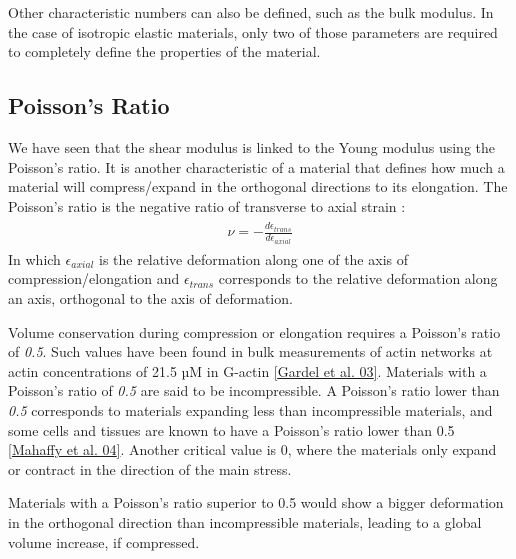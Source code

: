 \documentclass[A4paperpaper,11pt,english]{sphinxmanual}
\begin{document}
Other characteristic numbers can also be defined, such as the bulk modulus. In the case of isotropic
elastic materials, only two of those parameters are required to completely define
the properties of the material.


\subsection{Poisson's Ratio}
\label{index-latex:poisson-s-ratio}
We have seen that the shear modulus is linked to the Young modulus using
the Poisson's ratio. It is another characteristic of a material
that defines how much a material will compress/expand in the orthogonal directions to its elongation.
The Poisson's ratio is the negative ratio of transverse to axial strain :
\label{index-latex:equation-eqa10}\begin{gather}
\begin{split}\nu = - \frac{
    d \epsilon_{trans}
}{
    d \epsilon_{axial}
}\end{split}\label{index-latex-eqa10}
\end{gather}
In which \(\epsilon_{axial}\) is the relative deformation along one of the
axis of compression/elongation and \(\epsilon_{trans}\) corresponds to the
relative deformation along an axis, orthogonal to the axis of deformation.

Volume conservation during compression or elongation requires
a Poisson's ratio of \emph{0.5}. Such values have been found in bulk measurements of
actin networks at actin concentrations of 21.5 µM in G-actin {\hyperref[index-latex:gardel2003]{{[}Gardel et al. 03{]}}}. Materials with a Poisson's ratio of \emph{0.5} are
said to be incompressible. A Poisson's ratio lower than \emph{0.5} corresponds to materials
expanding less than incompressible materials, and some cells and tissues are known to
have a Poisson's ratio lower than 0.5 {\hyperref[index-latex:mahaffy2004]{{[}Mahaffy et al. 04{]}}}. Another critical value
is 0, where the materials only expand or contract in the direction of the
main stress.

Materials with a Poisson's ratio superior to 0.5 would show a bigger
deformation in the orthogonal direction than incompressible materials, leading
to a global volume increase, if compressed.
\end{document}
